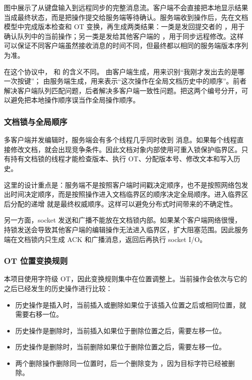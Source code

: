 图中展示了从键盘输入到远程同步的完整消息流。客户端不会直接把本地显示结果当成最终状态，而是把操作提交给服务端等待确认。服务端收到操作后，先在文档模型中完成版本检查和 OT 变换，再生成两类结果：一类是发回提交者的 ，用于确认队列中的当前操作；另一类是发给其他客户端的 ，用于同步远程修改。这样可以保证不同客户端虽然接收消息的时间不同，但最终都以相同的服务端版本序列为准。


在这个协议中， 和  的含义不同。 由客户端生成，用来识别“我刚才发出去的是哪一次按键”； 由服务端生成，用来表示“这次操作在全局文档历史中的顺序”。前者解决客户端队列匹配问题，后者解决多客户端一致性问题。把这两个编号分开，可以避免把本地操作顺序误当作全局操作顺序。

\subsubsection{文档锁与全局顺序}

多客户端并发编辑时，服务端会有多个线程几乎同时收到  消息。如果每个线程直接修改文档，就会出现竞争条件。因此文档对象内部使用可重入锁保护临界区。只有持有文档锁的线程才能检查版本、执行 OT、分配版本号、修改文本和写入历史。

这里的设计重点是：服务端不是按照客户端时间戳决定顺序，也不是按照网络包发出时间决定顺序，而是按照操作进入文档临界区的顺序决定全局顺序。进入临界区后分配的递增  就是最终权威顺序。这样可以避免分布式时间带来的不确定性。

另一方面，socket 发送和广播不能放在文档锁内部。如果某个客户端网络很慢，持锁发送会导致其他客户端的编辑操作无法进入临界区，扩大阻塞范围。因此服务端在文档锁内只生成 ACK 和广播消息，返回后再执行 socket I/O。

\subsubsection{OT 位置变换规则}

本项目使用字符级 OT，因此变换规则集中在位置调整上。当前操作会依次与它的  之后已经发生的历史操作进行比较：

\begin{itemize}
  \item 历史操作是插入时，当前插入或删除如果位于该插入位置之后或相同位置，就需要右移一位。
  \item 历史操作是删除时，当前插入如果位于删除位置之后，需要左移一位。
  \item 历史操作是删除时，当前删除如果位于删除位置之后，需要左移一位。
  \item 两个删除操作删除同一位置时，后一个删除变为 ，因为目标字符已经被删除。
\end{itemize}

